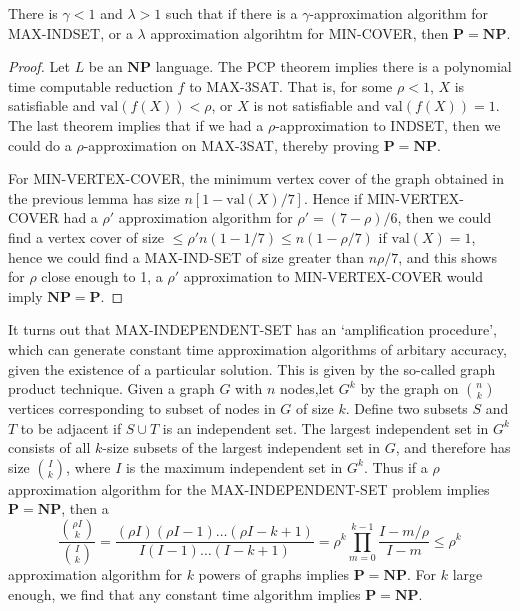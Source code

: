 \begin{theorem}
    There is $\gamma < 1$ and $\lambda > 1$ such that if there is a $\gamma$-approximation algorithm for MAX-INDSET, or a $\lambda$ approximation algorihtm for MIN-COVER, then $\mathbf{P} = \mathbf{NP}$.
\end{theorem}
\begin{proof}
    Let $L$ be an $\mathbf{NP}$ language. The PCP theorem implies there is a polynomial time computable reduction $f$ to MAX-3SAT. That is, for some $\rho < 1$, $X$ is satisfiable and $\text{val}(f(X)) < \rho$, or $X$ is not satisfiable and $\text{val}(f(X)) = 1$. The last theorem implies that if we had a $\rho$-approximation to INDSET, then we could do a $\rho$-approximation on MAX-3SAT, thereby proving $\mathbf{P} = \mathbf{NP}$.

    For MIN-VERTEX-COVER, the minimum vertex cover of the graph obtained in the previous lemma has size $n[1 - \text{val}(X)/7]$. Hence if MIN-VERTEX-COVER had a $\rho'$ approximation algorithm for $\rho' = (7 - \rho)/6$, then we could find a vertex cover of size $\leq \rho' n (1 - 1/7) \leq n (1 - \rho/7)$ if $\text{val}(X) = 1$, hence we could find a MAX-IND-SET of size greater than $n \rho/7$, and this shows for $\rho$ close enough to 1, a $\rho'$ approximation to MIN-VERTEX-COVER would imply $\mathbf{NP} = \mathbf{P}$.
\end{proof}

It turns out that MAX-INDEPENDENT-SET has an `amplification procedure', which can generate constant time approximation algorithms of arbitary accuracy, given the existence of a particular solution. This is given by the so-called graph product technique. Given a graph $G$ with $n$ nodes,let $G^k$ by the graph on ${n \choose k}$ vertices corresponding to subset of nodes in $G$ of size $k$. Define two subsets $S$ and $T$ to be adjacent if $S \cup T$ is an independent set. The largest independent set in $G^k$ consists of all $k$-size subsets of the largest independent set in $G$, and therefore has size ${I \choose k}$, where $I$ is the maximum independent set in $G^k$. Thus if a $\rho$ approximation algorithm for the MAX-INDEPENDENT-SET problem implies $\mathbf{P} = \mathbf{NP}$, then a
%
\[ \frac{{\rho I \choose k}}{{I \choose k}} = \frac{(\rho I)(\rho I - 1) \dots (\rho I - k + 1)}{I(I-1) \dots (I-k+1)} = \rho^k \prod_{m = 0}^{k-1} \frac{I - m/\rho}{I - m} \leq \rho^k \]
%
approximation algorithm for $k$ powers of graphs implies $\mathbf{P} = \mathbf{NP}$. For $k$ large enough, we find that any constant time algorithm implies $\mathbf{P} = \mathbf{NP}$.

